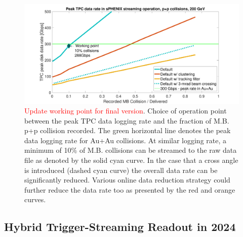 \begin{figure}[htbp]
\begin{center}
\includegraphics[width=.8\linewidth]{figs/TPCRateLayeredPP_Summary_13MHz_TriggerWindowRateCoverageCompile.pdf}
\caption{{\textcolor{red}{Update working point for final version}}. Choice of operation point between the peak TPC data logging rate and the fraction of M.B. p+p collision recorded. The green horizontal line denotes the peak data logging rate for Au+Au collisions. At similar logging rate, a minimum of 10\% of \pp M.B. collisions can be streamed to the raw data file as denoted by the solid cyan curve. In the case that a cross angle is introduced (dashed cyan curve) the overall data rate can be significantly reduced. Various online data reduction strategy could further reduce the data rate too as presented by the red and orange curves.}
\label{fig:TPC-DAQ-rate}
\end{center}
\end{figure}

 
 
\subsection{Hybrid Trigger-Streaming Readout in 2024}
 
